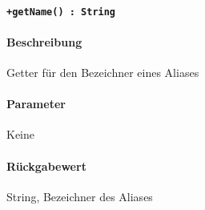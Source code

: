 \paragraph{\texttt{+getName() : String}}%
\paragraph*{Beschreibung}
Getter für den Bezeichner eines Aliases
\paragraph*{Parameter}
Keine
\paragraph*{Rückgabewert}
String, Bezeichner des Aliases